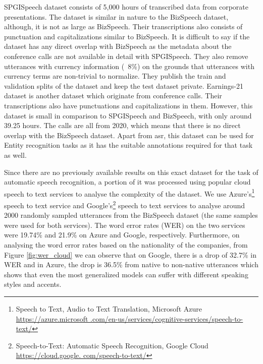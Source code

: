 SPGISpeech\cite{Oneill2021SPGISpeech:Recognition} dataset consists of 5,000 hours of transcribed data from corporate presentations. The dataset is similar in nature to the BizSpeech dataset, although, it is not as large as BizSpeech. Their transcriptions also consists of punctuation and capitalizations similar to BizSpeech. It is difficult to say if the dataset has any direct overlap with BizSpeech as the metadata about the conference calls are not available in detail with SPGISpeech. They also remove utterances with currency information (~8\%) on the grounds that utterances with currency terms are non-trivial to normalize. They publish the train and validation splits of the dataset and keep the test dataset private. Earnings-21 dataset \cite{DelRio2021Earnings-21:Wild} is another dataset which originate from conference calls. Their transcriptions also have punctuations and capitalizations in them. However, this dataset is small in comparison to SPGISpeech and BizSpeech, with only around 39.25 hours. The calls are all from 2020, which means that there is no direct overlap with the BizSpeech dataset. Apart from \acrshort{asr}, this dataset can be used for Entity recognition tasks as it has the suitable annotations required for that task as well.

Since there are no previously available results on this exact dataset for the task of automatic speech recognition, a portion of it was processed using popular cloud speech to text services to analyse the complexity of the dataset. We use Azure's\footnote{Speech to Text, Audio to Text Translation, Microsoft Azure \href{https://azure.microsoft.com/en-us/services/cognitive-services/speech-to-text/}{https://azure.microsoft .com/en-us/services/cognitive-services/speech-to-text/}} speech to text service and Google's\footnote{Speech-to-Text: Automatic Speech Recognition, Google Cloud \href{https://cloud.google.com/speech-to-text/}{https://cloud.google. com/speech-to-text/}} speech to text services to analyse around 2000 randomly sampled utterances from the BizSpeech dataset (the same samples were used for both services). The word error rates (WER) on the two services were 19.74\% and 21.9\% on Azure and Google, respectively. Furthermore, on analysing the word error rates based on the nationality of the companies, from Figure \ref{fig:wer_cloud} we can observe that on Google, there is a drop of 32.7\% in WER and in Azure, the drop is 36.5\% from native to non-native utterances which shows that even the most generalized models can suffer with different speaking styles and accents. 

